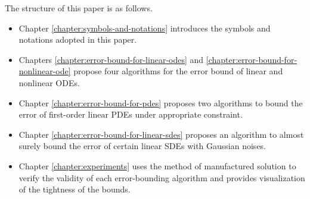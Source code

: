 The structure of this paper is as follows.
\begin{itemize}
    \item Chapter \ref{chapter:symbols-and-notations} introduces the symbols and notations adopted in this paper.
    \item Chapters \ref{chapter:error-bound-for-linear-odes} and \ref{chapter:error-bound-for-nonlinear-ode} propose four algorithms for the error bound of linear and nonlinear ODEs.
    \item Chapter \ref{chapter:error-bound-for-pdes} proposes two algorithms to bound the error of first-order linear PDEs under appropriate constraint.
    \item Chapter \ref{chapter:error-bound-for-linear-sdes} proposes an algorithm to almost surely bound the error of certain linear SDEs with Gaussian noises.
    \item Chapter \ref{chapter:experiments} uses the method of manufactured solution to verify the validity of each error-bounding algorithm and provides visualization of the tightness of the bounds.
\end{itemize}